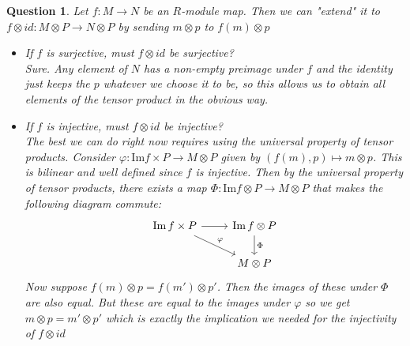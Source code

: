 \documentclass[a4paper]{article}
\newtheorem{que}[thm]{Question}
\begin{document}
\begin{que}
    Let $f:M\to N$ be an $R$-module map. Then we can  "extend" it to $f\otimes id : M\otimes P\to N\otimes P$ by sending $m\otimes p$ to $f(m)\otimes p$
    \begin{itemize}
        \item If $f$ is surjective, must $f\otimes id$ be surjective?\\
            Sure. Any element of $N$ has a non-empty preimage under $f$ and the identity just keeps the $p$ whatever we choose it to be, so this allows us to obtain all elements of the tensor product in the obvious way.
        \item If $f$ is injective, must $f\otimes id$ be injective?\\
            The best we can do right now requires using the universal property of tensor products. Consider $\varphi:\text{Im}f\times P\to M\otimes P$ given by $\left( f(m),p \right)\mapsto m\otimes p $. This is bilinear and well defined since $f$ is injective. Then by the universal property of tensor products, there exists a map $\Phi:\text{Im}f\otimes P\to M\otimes P$ that makes the following diagram commute:
            \[\begin{tikzcd}
            \Ima f \times P\arrow[r] \arrow[rd,"\varphi"] & \arrow[d,"\Phi"]\Ima f \otimes P\\ & M\otimes P
            \end{tikzcd}\]
            Now suppose $f(m)\otimes p=f(m')\otimes p'$. Then the images of these under $\Phi$ are also equal. But these are equal to the images under $\varphi$ so we get $m\otimes p=m'\otimes p'$ which is exactly the implication we needed for the injectivity of $f\otimes id$ 
    \end{itemize}
    
\end{que}
\end{document}
